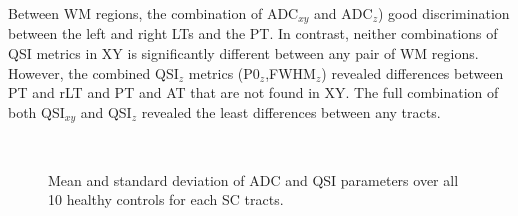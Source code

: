 Between WM regions, the combination of ADC$_{xy}$ and ADC$_{z}$) good discrimination between the left and right LTs and the PT. In contrast, neither combinations of QSI metrics in XY is significantly different between any pair of WM regions. However, the combined QSI$_z$ metrics (P0$_z$,FWHM$_z$) revealed differences between PT and rLT and PT and AT that are not found in XY. The full combination of both QSI$_{xy}$ and QSI$_{z}$ revealed the least differences between any tracts.


\begin{figure}
      \centering
	  \\
	  \caption{Mean and standard deviation of ADC and QSI parameters over all 10 healthy controls for each SC tracts.}
      \label{fig:chapter6 ADC and QSI vals}
\end{figure}%

